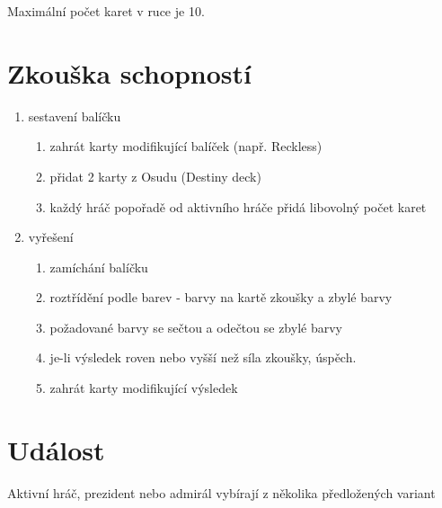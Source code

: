 \documentclass[a4paper,twocolumn]{article}
\begin{document}
Maximální počet karet v ruce je 10.\\

\section{Zkouška schopností}
\begin{enumerate}
\item sestavení balíčku
	\begin{enumerate}
 	\item zahrát karty modifikující balíček (např. Reckless)
	\item přidat 2 karty z Osudu (Destiny deck)
	\item každý hráč popořadě od aktivního hráče přidá libovolný počet karet
	\end{enumerate}
\item vyřešení 
	\begin{enumerate}
	\item zamíchání balíčku
	\item roztřídění podle barev - barvy na kartě zkoušky a zbylé barvy
	\item požadované barvy se sečtou a odečtou se zbylé barvy
	\item je-li výsledek roven nebo vyšší než síla zkoušky, úspěch.
	\item zahrát karty modifikující výsledek
	\end{enumerate}
\end{enumerate}

\section{Událost}
Aktivní hráč, prezident nebo admirál vybírají z několika předložených variant
\end{document}
